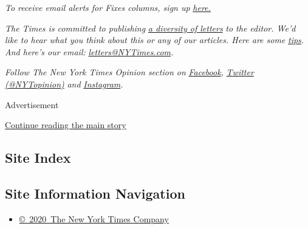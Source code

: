 \emph{To receive email alerts for Fixes columns, sign up}
\href{http://eepurl.com/ABIxL}{\emph{here.}}

\emph{The Times is committed to publishing}
\href{https://www.nytimes3xbfgragh.onion/2019/01/31/opinion/letters/letters-to-editor-new-york-times-women.html}{\emph{a
diversity of letters}} \emph{to the editor. We'd like to hear what you
think about this or any of our articles. Here are some}
\href{https://help.nytimes3xbfgragh.onion/hc/en-us/articles/115014925288-How-to-submit-a-letter-to-the-editor}{\emph{tips}}\emph{.
And here's our email:}
\href{mailto:letters@NYTimes.com}{\emph{letters@NYTimes.com}}\emph{.}

\emph{Follow The New York Times Opinion section on}
\href{https://www.facebookcorewwwi.onion/nytopinion}{\emph{Facebook}}\emph{,}
\href{http://twitter.com/NYTOpinion}{\emph{Twitter (@NYTopinion)}}
\emph{and}
\href{https://www.instagram.com/nytopinion/}{\emph{Instagram}}\emph{.}

Advertisement

\protect\hyperlink{after-bottom}{Continue reading the main story}

\hypertarget{site-index}{%
\subsection{Site Index}\label{site-index}}

\hypertarget{site-information-navigation}{%
\subsection{Site Information
Navigation}\label{site-information-navigation}}

\begin{itemize}
\tightlist
\item
  \href{https://help.nytimes3xbfgragh.onion/hc/en-us/articles/115014792127-Copyright-notice}{©~2020~The
  New York Times Company}
\end{itemize}

